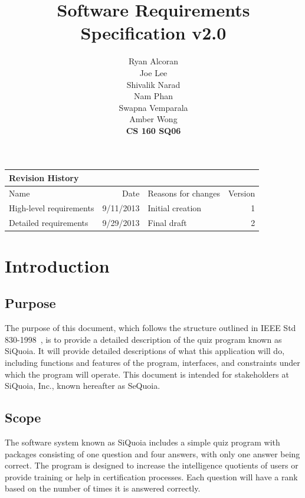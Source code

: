 \documentclass[12pt]{paper}
\title{Software Requirements Specification v2.0}
\author{\hfill \hspace{4.09in} Ryan Alcoran\\ \hfill Joe Lee\\ \hfill
  Shivalik Narad\\ \hfill Nam Phan\\ \hfill Swapna Vemparala\\ \hfill
  Amber Wong\\[2em] \hfill {\bf CS 160 SQ06}}
\begin{document}
\begin{titlepage}
\maketitle

\begin{table}[b]
\centering
\begin{tabular}{|l|r|l|r|}
  \multicolumn{4}{l}{\bf Revision History} \\
  \hline
  Name                    & Date       & Reasons for changes  & Version \\
  \hline
  High-level requirements & 9/11/2013  & Initial creation     & 1 \\
  \hline
  Detailed requirements   & 9/29/2013  & Final draft          & 2 \\
  \hline
\end{tabular}
\end{table}

\end{titlepage}

\newpage
\tableofcontents

\section{Introduction}
\label{sec:introduction}

\subsection{Purpose}
\label{subsec:purpose}
The purpose of this document, which follows the structure outlined in
IEEE Std 830-1998~\cite{IEEE:830-1998}, is to provide a detailed
description of the quiz program known as \gls{SiQuoia}. It will
provide detailed descriptions of what this application will do,
including functions and features of the program, interfaces, and
constraints under which the program will operate. This document is
intended for stakeholders at SiQuoia, Inc., known hereafter as
\gls{SeQuoia}.

\subsection{Scope}
\label{subsec:scope}
The software system known as SiQuoia includes a simple quiz program
with packages consisting of one question and four answers, with only
one answer being correct. The program is designed to increase the
intelligence quotients of users or provide training or help in
certification processes. Each question will have a rank based on the
number of times it is answered correctly.
\end{document}
